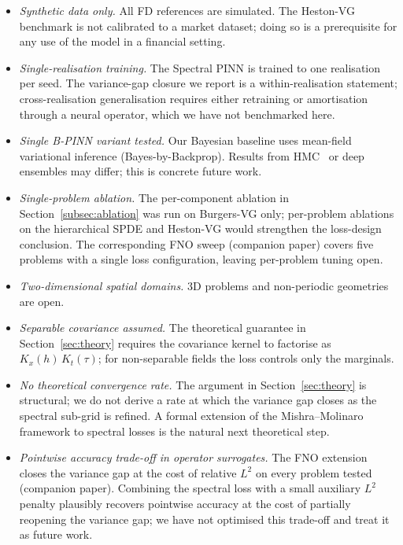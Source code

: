 \documentclass[review,12pt]{elsarticle}
\begin{document}
\begin{itemize}
\item \emph{Synthetic data only.} All FD references are simulated.
The Heston-VG benchmark is not calibrated to a market dataset;
doing so is a prerequisite for any use of the model in a financial
setting.
\item \emph{Single-realisation training.} The Spectral PINN is
trained to one realisation per seed. The variance-gap closure we
report is a within-realisation statement; cross-realisation
generalisation requires either retraining or amortisation through
a neural operator, which we have not benchmarked here.
\item \emph{Single B-PINN variant tested.} Our Bayesian baseline
uses mean-field variational inference (Bayes-by-Backprop). Results
from HMC~\cite{YangMengKarniadakis2021} or deep ensembles may
differ; this is concrete future work.
\item \emph{Single-problem ablation.} The per-component ablation
in Section~\ref{subsec:ablation} was run on Burgers-VG only;
per-problem ablations on the hierarchical SPDE and Heston-VG would
strengthen the loss-design conclusion. The corresponding
FNO sweep (companion paper) covers five problems with a single
loss configuration, leaving per-problem tuning open.
\item \emph{Two-dimensional spatial domains.} 3D problems and
non-periodic geometries are open.
\item \emph{Separable covariance assumed.} The theoretical
guarantee in Section~\ref{sec:theory} requires the covariance
kernel to factorise as \(K_x(h)\, K_t(\tau)\); for non-separable
fields the loss controls only the marginals.
\item \emph{No theoretical convergence rate.} The argument in
Section~\ref{sec:theory} is structural; we do not derive a rate
at which the variance gap closes as the spectral sub-grid is
refined. A formal extension of the Mishra--Molinaro framework to
spectral losses is the natural next theoretical step.
\item \emph{Pointwise accuracy trade-off in operator surrogates.} The
FNO extension closes the variance gap at the cost of relative
$L^2$ on every problem tested (companion paper).
Combining the spectral loss with a small auxiliary $L^2$ penalty
plausibly recovers pointwise accuracy at the cost of partially
reopening the variance gap; we have not optimised this trade-off
and treat it as future work.
\end{itemize}
\end{document}
